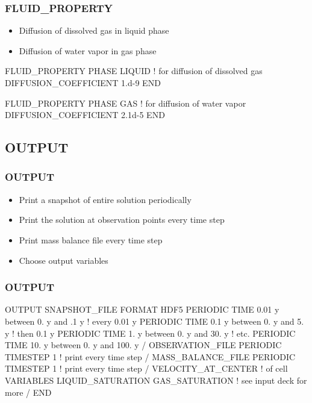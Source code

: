 \documentclass{beamer}
\newcommand\redcomment[1]{{{\color{red} #1}}}
\newcommand\bluecomment[1]{{{\color{blue} #1}}}
\begin{document}
\begin{frame}[fragile]\frametitle{FLUID\_PROPERTY}
\begin{itemize}
  \item Diffusion of dissolved gas in \redcomment{liquid phase}
  \item Diffusion of water vapor in \redcomment{gas phase}
\end{itemize}

\begin{semiverbatim}

FLUID_PROPERTY
  PHASE LIQUID \bluecomment{! for diffusion of dissolved gas}
  DIFFUSION_COEFFICIENT 1.d-9
END

FLUID_PROPERTY
  PHASE GAS \bluecomment{! for diffusion of water vapor}
  DIFFUSION_COEFFICIENT 2.1d-5
END
\end{semiverbatim}

\end{frame}

\subsection{OUTPUT}

\begin{frame}[fragile]\frametitle{OUTPUT}
\begin{itemize}
  \item Print a \redcomment{snapshot} of entire solution periodically
  \item Print the solution at \redcomment{observation points} every time step
  \item Print \redcomment{mass balance} file every time step
  \item Choose output \redcomment{variables}
\end{itemize}

\end{frame}

\begin{frame}[fragile]\frametitle{OUTPUT}

\begin{semiverbatim}\small
OUTPUT
  SNAPSHOT_FILE
    FORMAT HDF5
    PERIODIC TIME 0.01 y between 0. y and .1 y \bluecomment{! every 0.01 y}
    PERIODIC TIME 0.1 y between 0. y and 5. y  \bluecomment{! then 0.1 y}
    PERIODIC TIME 1. y between 0. y and 30. y  \bluecomment{! etc.}
    PERIODIC TIME 10. y between 0. y and 100. y
  /
  OBSERVATION_FILE
    PERIODIC TIMESTEP 1 \bluecomment{! print every time step}
  /
  MASS_BALANCE_FILE
    PERIODIC TIMESTEP 1 \bluecomment{! print every time step}
  /
  VELOCITY_AT_CENTER \bluecomment{! of cell}
  VARIABLES
    LIQUID_SATURATION
    GAS_SATURATION \bluecomment{! see input deck for more}
  /
END
\end{semiverbatim}

\end{frame}
\end{document}
